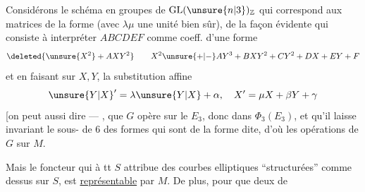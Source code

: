 

 Considérons le schéma en groupes de $\operatorname{GL}(\unsure{n|3})_{\mathbb Z}$ qui correspond aux matrices de la forme
(avec $\lambda\mu$ une unité bien sûr),  de la façon évidente qui consiste à interpréter $ABCDEF$ comme coeff. d'une forme
\[
\deleted{\unsure{X^2}+AXY^2}\qquad X^2\unsure{+|-}AY^3+BXY^2+CY^{2}+DX+EY+F
\]
et en faisant sur $X,Y$, la substitution affine
\[
\unsure{Y|X}'=\lambda\unsure{Y|X}+\alpha,\quad X'=\mu X+\beta Y+\gamma
\]
[on peut aussi dire --- , que $G$ opère sur le  $E_3$, donc dans $\Phi_3(E_3)$, et qu'il laisse invariant le sous- de  $6$ des formes qui sont de la forme dite, d'où les opérations de $G$ sur $M$.

Mais le foncteur qui à tt $S$ attribue   des courbes elliptiques ``structurées'' comme dessus sur $S$, est \uline{représentable} par $M$. De plus, pour que deux  de
